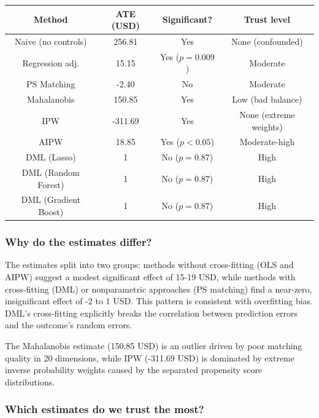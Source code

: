 \documentclass[10pt]{article}
\begin{document}
\begin{center}
    \begin{tabular}{|c|c|c|c|}
        \hline 
        \textbf{Method} & \textbf{ATE (USD)} & \textbf{Significant?} & \textbf{Trust level}\\\hline 
        Naive (no controls) & 256.81 & Yes & None (confounded)\\\hline 
        Regression adj. & 15.15 & Yes ($p = 0.009 $) & Moderate\\\hline 
        PS Matching & -2.40 & No & Moderate\\\hline 
        Mahalanobis & 150.85 & Yes & Low (bad balance)\\\hline 
        IPW & -311.69 & Yes & None (extreme weights)\\\hline 
        AIPW & 18.85 & Yes ($p < 0.05 $) & Moderate-high\\\hline 
        DML (Lasso) & 1 & No ($p = 0.87 $) & High\\\hline 
        DML (Random Forest) & 1 & No ($p = 0.87 $) & High\\\hline 
        DML (Gradient Boost) & 1 & No ($p = 0.87 $) & High\\\hline 
    \end{tabular}
\end{center}
\subsubsection{Why do the estimates differ?}

The estimates split into two groups: methods without cross-fitting (OLS and AIPW) suggest a modest significant effect of 15-19 USD, while methods with cross-fitting (DML) or nonparametric approaches (PS matching) find a near-zero, insignificant effect of -2 to 1 USD. This pattern is consistent with overfitting bias. DML's cross-fitting explicitly breaks the correlation between prediction errors and the outcome's random errors.

The Mahalanobis estimate (150.85 USD) is an outlier driven by poor matching quality in 20 dimensions, while IPW (-311.69 USD) is dominated by extreme inverse probability weights caused by the separated propensity score distributions. 

\subsubsection{Which estimates do we trust the most?}
\end{document}
